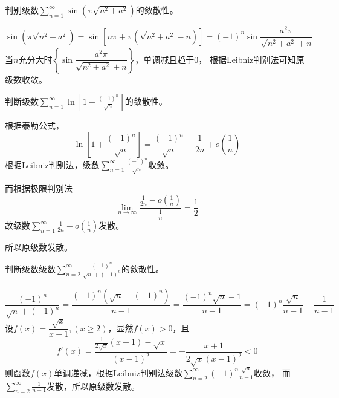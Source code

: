 \begin{example}
    判别级数$\displaystyle\sum_{n=1}^\infty \sin(\pi\sqrt{n^2+a^2})$的敛散性。
\end{example}
\begin{solution}
    \[
        \sin(\pi\sqrt{n^2+a^2})
        = \sin\left[n\pi + \pi\left(\sqrt{n^2+a^2} - n\right)\right]
        = (-1)^n\sin\frac{a^2\pi}{\sqrt{n^2+a^2}+n}
    \]
    当$n$充分大时$\left\{\sin\dfrac{a^2\pi}{\sqrt{n^2+a^2}+n}\right\}$，单调减且趋于$0$，
    根据Leibniz判别法可知原级数收敛。
\end{solution}

\begin{example}
    判断级数$\displaystyle\sum_{n=1}^\infty \ln \left[1+\frac{(-1)^n}{\sqrt{n}}\right]$的敛散性。
\end{example}
\begin{solution}
    根据泰勒公式，
    \[ \ln \left[1+\frac{(-1)^n}{\sqrt{n}}\right] = \frac{(-1)^n}{\sqrt{n}} - \frac{1}{2n} + o\left(\frac{1}{n}\right) \]
    根据Leibniz判别法，级数$\displaystyle\sum_{n=1}^\infty \frac{(-1)^n}{\sqrt{n}}$收敛。

    而根据极限判别法
    \[ \lim_{n\to\infty} \frac{\frac{1}{2n}-o\left(\frac{1}{n}\right)}{\frac{1}{n}} = \frac{1}{2} \]
    故级数$\displaystyle\sum_{n=1}^\infty \frac{1}{2n}-o\left(\frac{1}{n}\right)$发散。

    所以原级数发散。
\end{solution}

\begin{example}
    判断级数级数$\displaystyle\sum_{n=2}^\infty \frac{(-1)^n}{\sqrt{n}+(-1)^n}$的敛散性。
\end{example}
\begin{solution}
    \[
        \frac{(-1)^n}{\sqrt{n}+(-1)^n}
        =
        \frac{(-1)^n\left(\sqrt{n}-(-1)^n\right)}{n-1}
        =
        \frac{(-1)^n\sqrt{n}-1}{n-1}
        =
        (-1)^n\frac{\sqrt{n}}{n-1} - \frac{1}{n-1}
    \]
    设$f(x)=\dfrac{\sqrt{x}}{x-1}, (x\geq 2)$，显然$f(x)>0$，且
    \[
        f'(x)
        = \frac{\frac{1}{2\sqrt{x}}(x-1) - \sqrt{x}}{(x-1)^2}
        = -\frac{x+1}{2\sqrt{x}(x-1)^2}<0
    \]
    则函数$f(x)$单调递减，根据Leibniz判别法级数$\displaystyle\sum_{n=2}^\infty (-1)^n\frac{\sqrt{n}}{n-1}$收敛，
    而$\displaystyle\sum_{n=2}^\infty \frac{1}{n-1}$发散，所以原级数发散。
\end{solution}

